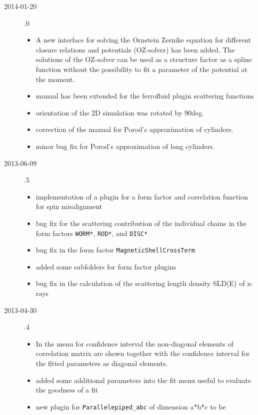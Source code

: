 \begin{description}
    \item[2014-01-20] .0
    \begin{itemize}
      \item A new interface for solving the Ornstein Zernike equation for different
            closure relations and potentials (OZ-solver) has been added. The solutions
            of the OZ-solver can be used as a structure factor as a spline function without the possibility to fit a parameter of the potential at the moment.
      \item manual has been extended for the ferrofluid plugin scattering functions
      \item orientation of the 2D simulation was rotated by 90deg.
      \item correction of the manual for Porod's approximation of cylinders.
      \item minor bug fix for Porod's approximation of long cylinders.
    \end{itemize}
    \item[2013-06-09] .5
    \begin{itemize}
      \item implementation of a plugin for a form factor and correlation function for spin misalignment
      \item  bug fix for the scattering contribution of the individual chains in the form factors \texttt{WORM*}, \texttt{ROD*}, and \texttt{DISC*}
      \item  bug fix in the form factor \texttt{MagneticShellCrossTerm}
      \item added some subfolders for form factor plugins
      \item bug fix in the calculation of the scattering length density SLD(E) of x-rays
    \end{itemize}
    \item[2013-04-30] .4
    \begin{itemize}
      \item In the menu for confidence interval the non-diagonal elements of
            correlation matrix are shown together with the confidence interval
            for the fitted parameters as diagonal elements.
      \item added some additional parameters into the fit menu useful to
            evaluate the goodness of a fit
      \item new plugin for \texttt{Parallelepiped\_abc} of dimension a*b*c to be

\end{itemize}
\end{description}
